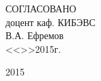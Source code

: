 \vfill

\begin{flushright}
\begin{minipage}{0.45\textwidth}
 \begin{flushleft}
  СОГЛАСОВАНО \\
  доцент каф. КИБЭВС \\
  \underline{\hspace{3cm}}В.А. Ефремов \\
  <<\underline{\hspace{1cm}}>>\underline{\hspace{3cm}}2015г.\\
 \end{flushleft}
\end{minipage}
\end{flushright}

\vfill

\begin{center}
 2015
\end{center}
